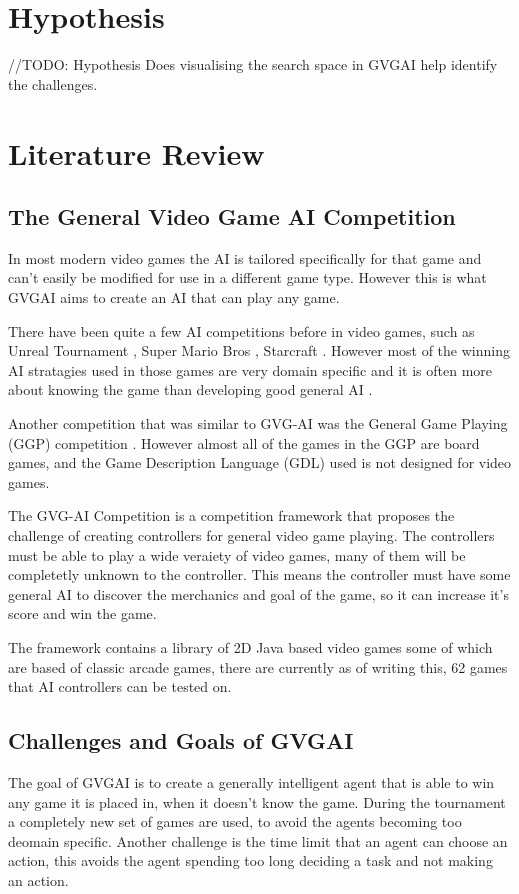 \documentclass[journal]{IEEEtran}
\begin{document}
\section{Hypothesis}

//TODO: Hypothesis
Does visualising the search space in GVGAI help identify the challenges.

\section{Literature Review}
\subsection{The General Video Game AI Competition}

In most modern video games the AI is tailored specifically for that game and can't easily be modified for use in a different game type. However this is what GVGAI aims to create an AI that can play any game. 

There have been quite a few AI competitions before in video games, such as Unreal Tournament \cite{hingston2010new}, Super Mario Bros \cite{citationNeeded}, Starcraft \cite{ontanon2013survey} \cite{perez20162014}. 
However most of the winning AI stratagies used in those games are very domain specific and it is often more about knowing the game than developing good general AI \cite{perez20162014}. 
 \par


Another competition that was similar to GVG-AI was the General Game Playing (GGP) competition \cite{GGP2005general}. However almost all of the games in the GGP are board games, and the Game Description Language (GDL) used is not designed for video games.

The GVG-AI Competition is a competition framework that proposes the challenge of creating controllers for general video game playing. The controllers must be able to play a wide veraiety of video games, many of them will be completetly unknown to the controller. This means the controller must have some general AI to discover the merchanics and goal of the game, so it can increase it's score and win the game. \cite{GVGAI, perez20162014}

The framework contains a library of 2D Java based video games some of which are based of classic arcade games, there are currently as of writing this, 62 games that AI controllers can be tested on.


\subsection{Challenges and Goals of GVGAI}
The goal of GVGAI is to create a generally intelligent agent that is able to win any game it is placed in, when it doesn't know the game.
During the tournament a completely new set of games are used, to avoid the agents becoming too deomain specific.
Another challenge is the time limit that an agent can choose an action, this avoids the agent spending too long deciding a task and not making an action. \cite{schuster2015mcts}
\end{document}
